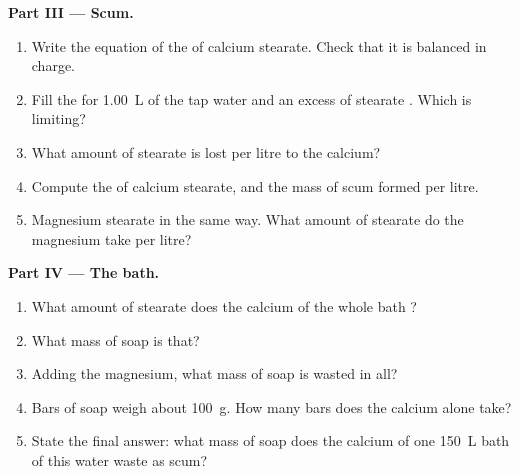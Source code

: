 \begin{problem}
\medskip
\noindent\textbf{Part III --- Scum.}
\begin{enumerate}[resume]
  \item Write the equation of the  of calcium stearate.
        Check that it is balanced in charge.
  \item Fill the  for \qty{1.00}{L} of the tap water and an
        excess of stearate . Which  is limiting?
  \item What amount of stearate  is lost per litre to the calcium?
  \item Compute the  of calcium stearate, and the mass of scum
        formed per litre.
  \item Magnesium stearate  in the same way. What amount of
        stearate do the magnesium  take per litre?
\end{enumerate}

\medskip
\noindent\textbf{Part IV --- The bath.}
\begin{enumerate}[resume]
  \item What amount of stearate  does the calcium of the whole bath
        ?
  \item What mass of soap is that?
  \item Adding the magnesium, what mass of soap is wasted in all?
  \item Bars of soap weigh about \qty{100}{g}. How many bars does the
        calcium alone take?
  \item State the final answer: what mass of soap does the calcium of one
        \qty{150}{L} bath of this water waste as scum?
\end{enumerate}
\end{problem}
